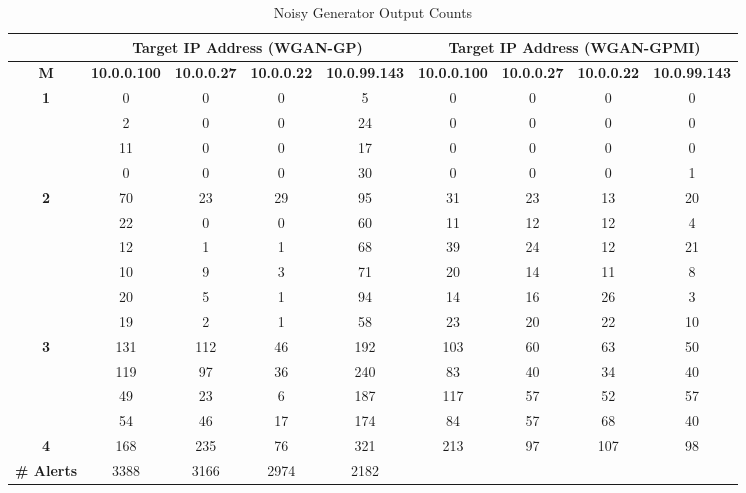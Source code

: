 \begin{table}[!htbp]
	\centering
	\caption{Noisy Generator Output Counts}
	\label{tab:random_outputs}
	\begin{adjustbox}{angle=90}
		\begin{tabular}{c|c|c|c|c|c|c|c|c}
			\multicolumn{1}{c|}{} & \multicolumn{4}{c|}{\textbf{Target IP Address (WGAN-GP)}} & \multicolumn{4}{c}{\textbf{Target IP Address (WGAN-GPMI)}} \\ \hline

			\textbf{M} & \multicolumn{1}{l|}{\textbf{10.0.0.100}} & \multicolumn{1}{l|}{\textbf{10.0.0.27}} & \multicolumn{1}{l|}{\textbf{10.0.0.22}} & \multicolumn{1}{l|}{\textbf{10.0.99.143}} & \multicolumn{1}{l|}{\textbf{10.0.0.100}} & \multicolumn{1}{l|}{\textbf{10.0.0.27}} & \multicolumn{1}{l|}{\textbf{10.0.0.22}} & \multicolumn{1}{l}{\textbf{10.0.99.143}} \\
			\hline
			\multirow{4}{*}{\textbf{1}} & 0  & 0  & 0  & 5  & 0  & 0  & 0  & 0  \\
			& 2   & 0 & 0  & 24 & 0  & 0  & 0  & 0  \\
			& 11  & 0 & 0  & 17 & 0  & 0  & 0  & 0  \\
			& 0   & 0 & 0  & 30 & 0  & 0  & 0  & 1  \\
			\hline
			\multirow{6}{*}{\textbf{2}} & 70 & 23 & 29 & 95 & 31 & 23 & 13 & 20 \\
			& 22  & 0 & 0  & 60 & 11 & 12 & 12 & 4  \\
			& 12  & 1 & 1  & 68 & 39 & 24 & 12 & 21 \\
			& 10  & 9 & 3  & 71 & 20 & 14 & 11 & 8  \\
			& 20  & 5 & 1  & 94 & 14 & 16 & 26 & 3  \\
			& 19  & 2 & 1  & 58 & 23 & 20 & 22 & 10 \\
			\hline
			\multirow{4}{*}{\textbf{3}} & 131 & 112 & 46 & 192 & 103 & 60 & 63 & 50 \\
			& 119 & 97 & 36  & 240 & 83 & 40 & 34 & 40 \\
			& 49  & 23 & 6  & 187  & 117 & 57  & 52 & 57 \\
			& 54  & 46 & 17 & 174  & 84  & 57  & 68 & 40 \\
			\hline
			\textbf{4} & 168 & 235 & 76 & 321 & 213 & 97 & 107 & 98 \\
			\hline
			\hline
			\multicolumn{1}{l|}{\textbf{\# Alerts}} & \multicolumn{1}{c|}{3388} & \multicolumn{1}{c|}{3166} & \multicolumn{1}{c|}{2974} & \multicolumn{1}{c|}{2182} & \multicolumn{1}{l|}{} & \multicolumn{1}{l|}{} & \multicolumn{1}{l|}{} & \multicolumn{1}{l}{} \\

\end{tabular}
\end{adjustbox}
\end{table}
